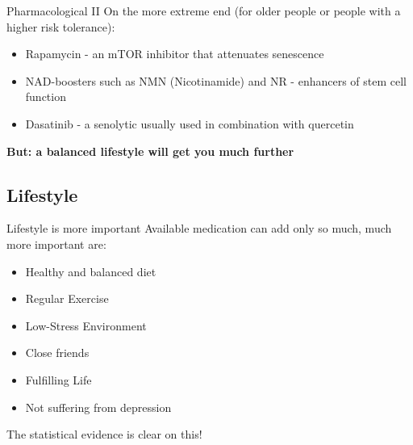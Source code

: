 \begin{frame}[c]{Pharmacological II}
    \large
    On the more extreme end (for older people or people with a higher risk tolerance):

    \begin{itemize}[<+(1)->]
        \item Rapamycin - an mTOR inhibitor that attenuates senescence
        \item NAD-boosters such as NMN (Nicotinamide) and NR - enhancers of stem cell function

        \item Dasatinib - a senolytic usually used in combination with quercetin
    \end{itemize}
    \pause
    \LARGE
    \textbf{But: a balanced lifestyle will get you much further}
\end{frame}


\subsection{Lifestyle}

\begin{frame}[c]{Lifestyle is more important}
    \large
    Available medication can add only so much, much more important are:

    \begin{itemize}[<+(1)->]
        \item Healthy and balanced diet \cite{willcox2007caloric}
        \item Regular Exercise \cite{lee1995exercise}
        \item Low-Stress Environment
        \item Close friends \cite{olsen1991social}
        \item Fulfilling Life \cite{diener2011happy}
        \item Not suffering from depression \cite{cuijpers2002excess}
    \end{itemize}
    \pause
    The statistical evidence is clear on this!
\end{frame}
